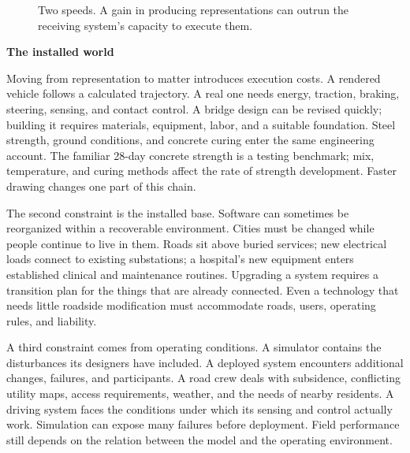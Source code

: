 \documentclass[11pt,openany]{book}
\newcommand{\subhead}[1]{\par\medskip\noindent\textbf{#1}\par\nobreak\smallskip}
\begin{document}
\begin{figure}[ht]
\centering
{}
\caption{Two speeds. A gain in producing representations can outrun the receiving system's capacity to execute them.}
\label{fig:two-speeds}
\end{figure}


\subhead{The installed world}

Moving from representation to matter introduces execution costs. A rendered vehicle follows a calculated trajectory. A real one needs energy, traction, braking, steering, sensing, and contact control. A bridge design can be revised quickly; building it requires materials, equipment, labor, and a suitable foundation. Steel strength, ground conditions, and concrete curing enter the same engineering account. The familiar 28-day concrete strength is a testing benchmark; mix, temperature, and curing methods affect the rate of strength development. Faster drawing changes one part of this chain.

The second constraint is the installed base. Software can sometimes be reorganized within a recoverable environment. Cities must be changed while people continue to live in them. Roads sit above buried services; new electrical loads connect to existing substations; a hospital's new equipment enters established clinical and maintenance routines. Upgrading a system requires a transition plan for the things that are already connected. Even a technology that needs little roadside modification must accommodate roads, users, operating rules, and liability.

A third constraint comes from operating conditions. A simulator contains the disturbances its designers have included. A deployed system encounters additional changes, failures, and participants. A road crew deals with subsidence, conflicting utility maps, access requirements, weather, and the needs of nearby residents. A driving system faces the conditions under which its sensing and control actually work. Simulation can expose many failures before deployment. Field performance still depends on the relation between the model and the operating environment.
\end{document}
